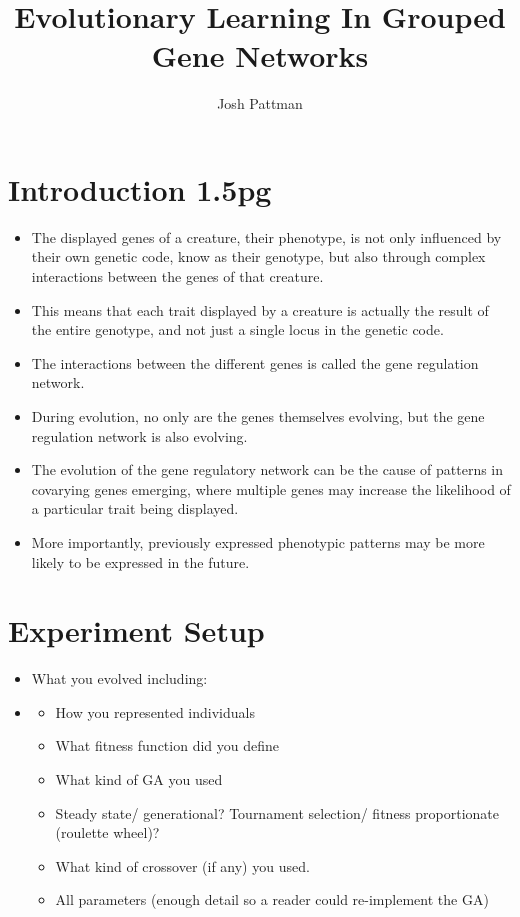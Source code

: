 \documentclass[twocolumn,a4paper]{article}
\author{Josh Pattman}
\title{Evolutionary Learning In Grouped Gene Networks}
\begin{document}
	\maketitle
    \section{Introduction 1.5pg}
    \begin{itemize}
        \item The displayed genes of a creature, their phenotype, is not only influenced by their own genetic code, know as their genotype, but also through complex interactions between the genes of that creature.
        \item This means that each trait displayed by a creature is actually the result of the entire genotype, and not just a single locus in the genetic code.
        \item The interactions between the different genes is called the gene regulation network.
        \item During evolution, no only are the genes themselves evolving, but the gene regulation network is also evolving.
        \item The evolution of the gene regulatory network can be the cause of patterns in covarying genes emerging, where multiple genes may increase the likelihood of a particular trait being displayed.
        \item More importantly, previously expressed phenotypic patterns may be more likely to be expressed in the future.
    \end{itemize}

    \section{Experiment Setup}
    \begin{itemize}
        \item What you evolved including:
        \item \begin{itemize}
            \item How you represented individuals
            \item What fitness function did you define
            \item What kind of GA you used
            \item Steady state/ generational?  Tournament selection/ fitness proportionate (roulette wheel)?
            \item What kind of crossover (if any) you used.
            \item All parameters (enough detail so a reader could re-implement the GA)
        \end{itemize}
    \end{itemize}
\end{document}
